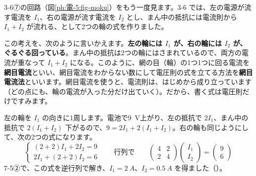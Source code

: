 \leavevmode\label{ph:電-5:sec3}3-6⑦の回路（図\ref{ph:電-5:fig-moku}）をもう一度見ます。3-6 では、左の電源が流す電流を $I_1$、右の電源が流す電流を $I_2$ とし、まん中の抵抗には電流則から $I_1+I_2$ が流れる、として2つの輪の式を作りました。

この考えを、次のように言いかえます。\textbf{左の輪には $I_1$ が、右の輪には $I_2$ が、ぐるぐる回っている}。まん中の抵抗は2つの輪にはさまれているので、両方の電流が重なって $I_1+I_2$ になる。このように、網の目（輪）の1つ1つに回る電流を\textbf{網目電流}といい、網目電流をわからない数にして電圧則の式を立てる方法を\textbf{網目電流法}といいます。網目電流を使うと、電流則は、はじめから成り立っています（どの点にも、輪の電流が入った分だけ出ていく）。だから、書く式は電圧則だけですみます。

\begin{bkfigure}
\label{ph:電-5:fig-moku}
\end{bkfigure}

左の輪を $I_1$ の向きに1周します。電池で\qty{9}{V}上がり、左の抵抗で $2I_1$、まん中の抵抗で $2(I_1+I_2)$ 下がるので、$9=2I_1+2(I_1+I_2)$。右の輪も同じようにして、次の2つの式になります。
\[ \begin{cases} (2+2)I_1+2I_2=9\\ 2I_1+(2+2)I_2=6 \end{cases}\qquad\text{行列で}\qquad \begin{pmatrix}4&2\\2&4\end{pmatrix}\begin{pmatrix}I_1\\I_2\end{pmatrix}=\begin{pmatrix}9\\6\end{pmatrix} \]
7-5②で、この式を逆行列で解き、$I_1=\qty{2}{A}$、$I_2=\qty{0.5}{A}$ を得ました（）。

